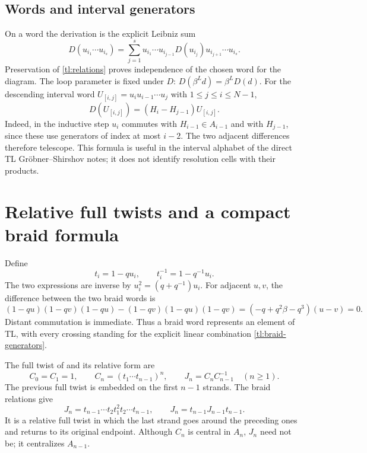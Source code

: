 \documentclass[a4paper,11pt,oneside,reqno]{amsart}
\theoremstyle{definition}
\numberwithin{equation}{section}
\begin{document}
	\subsection{Words and interval generators}
	On a word the derivation is the explicit Leibniz sum
	\begin{equation}\label{tl:D-word}
		D(u_{i_1}\cdots u_{i_s})=
		\sum_{j=1}^s u_{i_1}\cdots u_{i_{j-1}}D(u_{i_j})
		u_{i_{j+1}}\cdots u_{i_s}.
	\end{equation}
	Preservation of \eqref{tl:relations} proves independence of the chosen
	word for the diagram.  The loop parameter is fixed under $D$:
	$D(\beta^L d)=\beta^LD(d)$.
	For the descending interval word $U_{[i,j]}=u_i u_{i-1}\cdots u_j$
	with $1\le j\le i\le N-1$,
	\begin{equation}\label{tl:D-interval}
		\boxed{D(U_{[i,j]})=(H_i-H_{j-1})U_{[i,j]}.}
	\end{equation}
	Indeed, in the inductive step $u_i$ commutes with $H_{i-1}\in A_{i-1}$
	and with $H_{j-1}$, since these use generators of index at most
	$i-2$.  The two adjacent differences therefore telescope.
	This formula is useful in the interval alphabet of the direct TL
	Gr\"obner--Shirshov notes; it does not identify resolution cells with
	their products.
	
	
	\section{Relative full twists and a compact braid formula}\label{tl:braids}
	Define
	\begin{equation}\label{tl:braid-generators}
		t_i=1-qu_i,\qquad t_i^{-1}=1-q^{-1}u_i.
	\end{equation}
	The two expressions are inverse by $u_i^2=(q+q^{-1})u_i$.
	For adjacent $u,v$, the difference between the two braid words is
	\[
	(1-qu)(1-qv)(1-qu)-(1-qv)(1-qu)(1-qv)
	=(-q+q^2\beta-q^3)(u-v)=0.
	\]
	Distant commutation is immediate.  Thus a braid word represents an
	element of TL, with every crossing standing for the explicit linear
	combination \eqref{tl:braid-generators}.
	
	The full twist of \cite[Appendix~A]{RSA} and its relative form are
	\begin{equation}\label{tl:full-relative}
		C_0=C_1=1,\qquad C_n=(t_1\cdots t_{n-1})^n,\qquad
		J_n=C_nC_{n-1}^{-1}\quad(n\ge1).
	\end{equation}
	The previous full twist is embedded on the first $n-1$ strands.
	The braid relations give
	\begin{equation}\label{tl:Jn-palindrome}
		J_n=t_{n-1}\cdots t_2t_1^2t_2\cdots t_{n-1},\qquad
		J_n=t_{n-1}J_{n-1}t_{n-1}.
	\end{equation}
	It is a relative full twist in which the last strand goes around the
	preceding ones and returns to its original endpoint.  Although $C_n$
	is central in $A_n$, $J_n$ need not be; it centralizes $A_{n-1}$.
	
\end{document}
